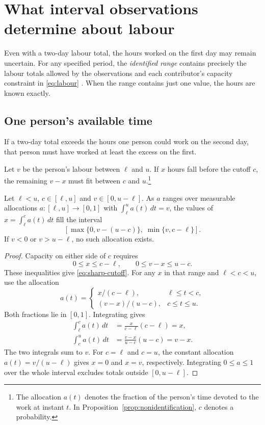 \section{What interval observations determine about labour}
\label{sec:sharp-identification}

Even with a two-day labour total, the hours worked on the first day may remain uncertain. For any specified period, the \emph{identified range} contains precisely the labour totals allowed by the observations and each contributor's capacity constraint in \eqref{eq:labour} \cite[Section~1]{torgovitsky2019}. When the range contains just one value, the hours are known exactly.

\subsection{One person's available time}

If a two-day total exceeds the hours one person could work on the second day, that person must have worked at least the excess on the first.

Let $v$ be the person's labour between $\ell$ and $u$. If $x$ hours fall before the cutoff $c$, the remaining $v-x$ must fit between $c$ and $u$.\footnote{The allocation $a(t)$ denotes the fraction of the person's time devoted to the work at instant $t$. In Proposition~\ref{prop:nonidentification}, $c$ denotes a probability.}

\begin{proposition}
\label{prop:sharp-cutoff}
Let $\ell<u$, $c\in[\ell,u]$ and $v\in[0,u-\ell]$. As $a$ ranges over measurable allocations $a:[\ell,u]\to[0,1]$ with $\int_\ell^u a(t)\,dt=v$, the values of $x=\int_\ell^c a(t)\,dt$ fill the interval
\begin{equation}
\label{eq:sharp-cutoff}
 \left[\max\{0,v-(u-c)\},\;\min\{v,c-\ell\}\right].
\end{equation}
If $v<0$ or $v>u-\ell$, no such allocation exists.
\end{proposition}
\begin{proof}
Capacity on either side of $c$ requires
\[
 0\leq x\leq c-\ell,\qquad 0\leq v-x\leq u-c.
\]
These inequalities give \eqref{eq:sharp-cutoff}. For any $x$ in that range and $\ell<c<u$, use the allocation
\[
 a(t)=\begin{cases}
 x/(c-\ell),&\ell\leq t<c,\\
 (v-x)/(u-c),&c\leq t\leq u.
 \end{cases}
\]
Both fractions lie in $[0,1]$. Integrating gives
\begin{align*}
 \int_\ell^c a(t)\,dt&=\frac{x}{c-\ell}(c-\ell)=x,\\
 \int_c^u a(t)\,dt&=\frac{v-x}{u-c}(u-c)=v-x.
\end{align*}
The two integrals sum to $v$. For $c=\ell$ and $c=u$, the constant allocation $a(t)=v/(u-\ell)$ gives $x=0$ and $x=v$, respectively. Integrating $0\leq a\leq1$ over the whole interval excludes totals outside $[0,u-\ell]$.
\end{proof}

